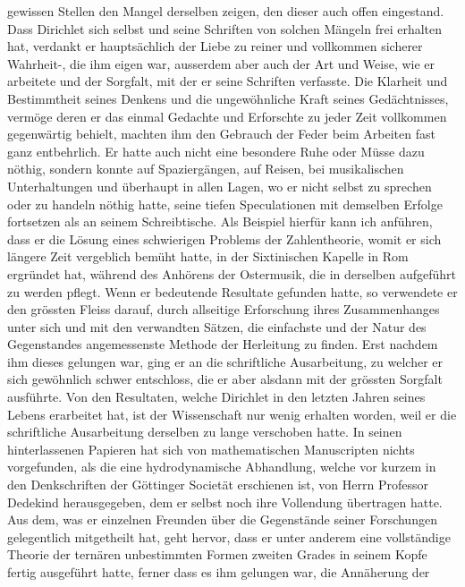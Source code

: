 \documentclass[11pt]{article}
\begin{document}
\noindent gewissen Stellen den Mangel derselben zeigen, den dieser auch offen eingestand. Dass Dirichlet sich selbst und seine Schriften von solchen Mängeln frei erhalten hat, verdankt er hauptsächlich der Liebe zu reiner und vollkommen sicherer Wahrheit-, die ihm eigen war, ausserdem aber auch der Art und Weise, wie er arbeitete und der Sorgfalt, mit der er seine Schriften verfasste. Die Klarheit und Bestimmtheit seines Denkens und die ungewöhnliche Kraft seines Gedächtnisses, vermöge deren er das einmal Gedachte und Erforschte zu jeder Zeit vollkommen gegenwärtig behielt, machten ihm den Gebrauch der Feder beim Arbeiten fast ganz entbehrlich. Er hatte auch nicht eine besondere Ruhe oder Müsse dazu nöthig, sondern konnte auf Spaziergängen, auf Reisen, bei musikalischen Unterhaltungen und überhaupt in allen Lagen, wo er nicht selbst zu sprechen oder zu handeln nöthig hatte, seine tiefen Speculationen mit demselben Erfolge fortsetzen als an seinem Schreibtische. Als Beispiel hierfür kann ich anführen, dass er die Lösung eines schwierigen Problems der Zahlentheorie, womit er sich längere Zeit vergeblich bemüht hatte, in der Sixtinischen Kapelle in Rom ergründet hat, während des Anhörens der Ostermusik, die in derselben aufgeführt zu werden pflegt. Wenn er bedeutende Resultate gefunden hatte, so verwendete er den grössten Fleiss darauf, durch allseitige Erforschung ihres Zusammenhanges unter sich und mit den verwandten Sätzen, die einfachste und der Natur des Gegenstandes angemessenste Methode der Herleitung zu finden. Erst nachdem ihm dieses gelungen war, ging er an die schriftliche Ausarbeitung, zu welcher er sich gewöhnlich schwer entschloss, die er aber alsdann mit der grössten Sorgfalt ausführte. Von den Resultaten, welche Dirichlet in den letzten Jahren seines Lebens erarbeitet hat, ist der Wissenschaft nur wenig erhalten worden, weil er die schriftliche Ausarbeitung derselben zu lange verschoben hatte. In seinen hinterlassenen Papieren hat sich von mathematischen Manuscripten nichts vorgefunden, als die eine hydrodynamische Abhandlung, welche vor kurzem in den Denkschriften der Göttinger Societät erschienen ist, von Herrn Professor Dedekind herausgegeben, dem er selbst noch ihre Vollendung übertragen hatte. Aus dem, was er einzelnen Freunden über die Gegenstände seiner Forschungen gelegentlich mitgetheilt hat, geht hervor, dass er unter anderem eine vollständige Theorie der ternären unbestimmten Formen zweiten Grades in seinem Kopfe fertig ausgeführt hatte, ferner dass es ihm gelungen war, die Annäherung der \par
\end{document}
